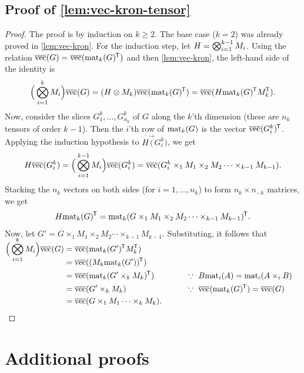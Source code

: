 \subsection{Proof of \cref{lem:vec-kron-tensor}}


\begin{proof}%
The proof is by induction on $k \ge 2$.
The base case ($k = 2$) was already proved in \cref{lem:vec-kron}.
For the induction step, let $H = \bigkron_{i=1}^{k-1} M_i$.
Using the relation $\vec(G) = \vec(\mat{k}{G}\tr)$ and then \cref{lem:vec-kron}, the left-hand side of the identity is
\begin{align*}
\LR{\bigkron_{i=1}^k M_i}\vec(G)
=
(H \kron M_k)\vec(\mat{k}{G}\tr)
=
\vec(H\mat{k}{G}\tr M_k\tr)
.
\end{align*}
Now, consider the slices $G^k_1 ,\ldots, G^k_{n_k}$ of $G$ along the $k$'th dimension (these are $n_k$ tensors of order $k-1$). 
Then the $i$'th row of $\mat{k}{G}$ is the vector $\vec(G^k_i)\tr$.  Applying
the induction hypothesis to $H \vec(G^k_i)$, we get
\begin{align*}
H\vec(G^k_i)
=
\LR{\bigkron_{i=1}^{k-1} M_i} \vec(G^k_i)
=
\vec(G^k_i  \times_1 M_1 \times_2 M_2 \cdots \times_{k-1} M_{k-1})
.
\end{align*}
Stacking the $n_k$ vectors on both sides (for $i = 1,\ldots,n_k$) to form
$n_k \times n_{-k}$ matrices, we get
$$
H \mat{k}{G}\tr
=
\mat{k}{G \times_1 M_1 \times_2 M_2 \cdots \times_{k-1} M_{k-1}}\tr
.
$$
Now, let $G' = G \times_1 M_1 \times_2 M_2 \cdots \times_{k-1}
M_{k-1}$.
Substituting, it follows that
\begin{align*}
\smash{\LR{\bigkron_{i=1}^k M_i}} \vec(G)
&=
\vec(\mat{k}{G'}\tr M_k\tr)
\\
&= \vec((M_k\mat{k}{G'})\tr)
\\
&=
\vec(\mat{k}{G' \times_k M_k}\tr)
&&\qquad\because ~ B\mat{i}{A} = \mat{i}{A \times_i B}
\\
&=
\vec(G' \times_k M_k)
&&\qquad\because ~ \vec(\mat{k}{G}\tr) = \vec(G)
\\
&=
\vec(G \times_1 M_1 \cdots \times_k M_k)
.&&\qedhere
\end{align*}
\end{proof}


\section{Additional proofs}
\label{sec:moreproofs}

